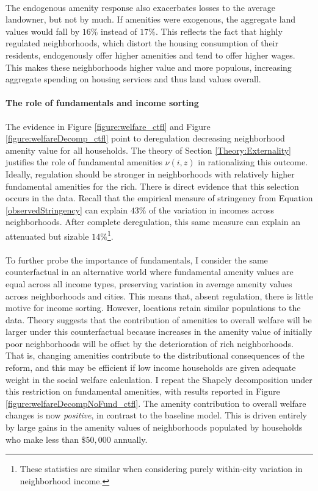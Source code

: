 \documentclass[12pt]{article}
\begin{document}
\paragraph*{}
The endogenous amenity response also exacerbates losses to the average landowner, but not by much. If amenities were exogenous, the aggregate land values would fall by $16 \%$ instead of $17 \%$. This reflects the fact that highly regulated neighborhoods, which distort the housing consumption of their residents, endogenously offer higher amenities and tend to offer higher wages. This makes these neighborhoods higher value and more populous, increasing aggregate spending on housing services and thus land values overall. 

\paragraph*{The role of fundamentals and income sorting} The evidence in Figure \ref{figure:welfare_ctfl} and Figure \ref{figure:welfareDecomp_ctfl} point to deregulation decreasing neighborhood amenity value for all households. The theory of Section \ref{Theory:Externality} justifies the role of fundamental amenities $\nu(i, z)$ in rationalizing this outcome. Ideally, regulation should be stronger in neighborhoods with relatively higher fundamental amenities for the rich. There is direct evidence that this selection occurs in the data. Recall that the empirical measure of stringency from Equation \eqref{observedStringency} can explain $43 \%$ of the variation in incomes across neighborhoods. After complete deregulation, this same measure can explain an attenuated but sizable $14 \%$\footnote{These statistics are similar when considering purely within-city variation in neighborhood income.}.   

\paragraph*{}
To further probe the importance of fundamentals, I consider the same counterfactual in an alternative world where fundamental amenity values are equal across all income types, preserving variation in average amenity values across neighborhoods and cities. This means that, absent regulation, there is little motive for income sorting. However, locations retain similar populations to the data. Theory suggests that the contribution of amenities to overall welfare will be larger under this counterfactual because increases in the amenity value of initially poor neighborhoods will be offset by the deterioration of rich neighborhoods. That is, changing amenities contribute to the distributional consequences of the reform, and this may be efficient if low income households are given adequate weight in the social welfare calculation. I repeat the Shapely decomposition under this restriction on fundamental amenities, with results reported in Figure \ref{figure:welfareDecompNoFund_ctfl}. The amenity contribution to overall welfare changes is now \textit{positive}, in contrast to the baseline model. This is driven entirely by large gains in the amenity values of neighborhoods populated by households who make less than $\$50,000$ annually. 
\end{document}
